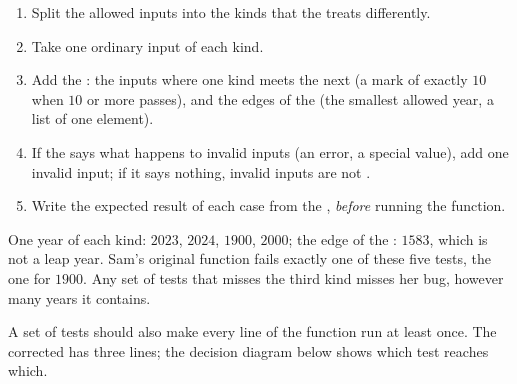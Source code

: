 \begin{method}\label{met:g10:specifications-and-tests:choose}
\begin{enumerate}
  \item Split the allowed inputs into the kinds that the  treats differently.
  \item Take one ordinary input of each kind.
  \item Add the : the inputs where one kind meets the next (a mark of exactly $10$ when $10$ or more
    passes), and the edges of the  (the smallest allowed year, a list of one element).
  \item If the  says what happens to invalid inputs (an error, a special value), add one invalid
    input; if it says nothing, invalid inputs are not .
  \item Write the expected result of each case from the , \emph{before} running the function.
\end{enumerate}
\end{method}

\begin{example}\label{ex:g10:specifications-and-tests:leap-tests}
One year of each kind: $2023$, $2024$, $1900$, $2000$; the edge of the : $1583$, which is not a leap
year. Sam's original function fails exactly one of these five tests, the one for $1900$. Any set of tests that misses the
third kind misses her bug, however many years it contains.
\end{example}

A set of tests should also make every line of the function run at least once. The corrected  has
three  lines; the decision diagram below shows which test reaches which.

